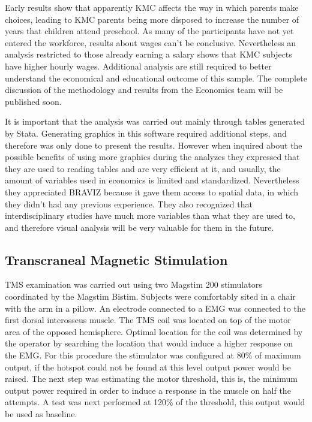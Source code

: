 Early results show that apparently KMC affects the way in which parents make choices, leading to KMC parents being more disposed to increase the number of years that children attend preschool. As many of the participants have not yet entered the workforce, results about wages can't be conclusive. Nevertheless an analysis restricted to those already earning a salary shows that KMC subjects have higher hourly wages. Additional analysis are still required to better understand the economical and educational outcome of this sample.  The complete discussion of the methodology and results from the Economics team will be published soon.

It is important that the analysis was carried out mainly through tables generated by Stata. Generating graphics in this software required additional steps, and therefore was only done to present the results. However when inquired about the possible benefits of using more graphics during the analyzes they expressed that they are used to reading tables and are very efficient at it, and usually, the amount of variables used in economics is limited and standardized. Nevertheless they appreciated BRAVIZ because it gave them access to spatial data, in which they didn't had any previous experience. They also recognized that interdisciplinary studies have much more variables than what they are used to, and therefore visual analysis will be very valuable for them in the future.


\subsection{Transcraneal Magnetic Stimulation}

TMS examination was carried out using two Magstim 200 stimulators coordinated by the Magstim Bistim. Subjects were comfortably sited in a chair with the arm in a pillow. An electrode connected to a EMG was connected to the first dorsal interosseus muscle. The TMS coil was located on top of the motor area of the opposed hemisphere. Optimal location for the coil was determined by the operator by searching the location that would induce a higher response on the EMG. For this procedure the stimulator was configured at 80\% of maximum output, if the hotspot could not be found at this level output power would be raised. The next step was estimating the motor threshold, this is, the minimum output power required in order to induce a response in the muscle on half the attempts. A test was next performed at 120\% of the threshold, this output would be used as baseline.

